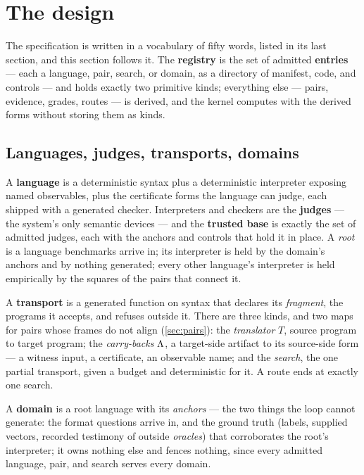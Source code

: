 
\section{The design}
\label{sec:design}

The specification is written in a vocabulary of fifty words, listed
in its last section, and this section follows it. The
\textbf{registry} is the set of admitted \textbf{entries} --- each a
language, pair, search, or domain, as a directory of manifest, code,
and controls --- and holds exactly two primitive kinds; everything else --- pairs, evidence,
grades, routes --- is derived, and the kernel computes with the
derived forms without storing them as kinds.

\subsection{Languages, judges, transports, domains}
\label{sec:kinds}

A \textbf{language} is a deterministic syntax plus a deterministic
interpreter exposing named observables, plus the certificate forms
the language can judge, each shipped with a generated checker.
Interpreters and checkers are the \textbf{judges} --- the system's
only semantic devices --- and the \textbf{trusted base} is exactly
the set of admitted judges, each with the anchors and controls that
hold it in place. A \emph{root} is a language benchmarks arrive in; its
interpreter is held by the domain's anchors and by nothing
generated; every other language's interpreter is held empirically by
the squares of the pairs that connect it.

A \textbf{transport} is a generated function on syntax that declares
its \emph{fragment}, the programs it accepts, and refuses outside it.
There are three kinds, and two maps for pairs whose frames do not
align (\cref{sec:pairs}): the \emph{translator} $T$, source program to target
program; the \emph{carry-backs} $\Lambda$, a target-side artifact to its
source-side form --- a witness input, a certificate, an observable
name; and the \emph{search}, the one partial transport, given a
budget and deterministic for it. A route ends at exactly one search.

A \textbf{domain} is a root language with its \emph{anchors} --- the
two things the loop cannot generate: the format questions arrive in,
and the ground truth (labels, supplied vectors, recorded testimony of
outside \emph{oracles}) that corroborates the root's interpreter; it owns nothing else and
fences nothing, since every admitted language, pair, and search
serves every domain.

